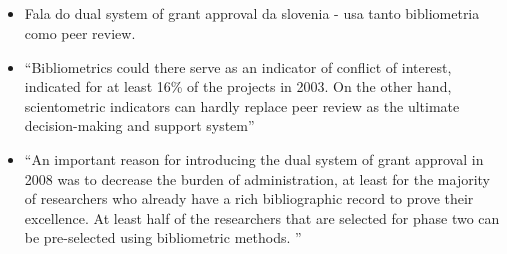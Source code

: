\documentclass[11pt]{article}
\begin{document}
\subsection{\cite{juznic2010}}
\label{sec:org89b9a2c}
\begin{itemize}
\item Fala do dual system of grant approval da slovenia - usa tanto bibliometria como peer review.
\item ``Bibliometrics could there serve as an indicator of conflict of interest, indicated for at least 16\% of the projects in 2003. On the other hand, scientometric indicators can hardly replace peer review as the ultimate decision-making and support system''
\item ``An important reason for introducing the dual system of grant approval in 2008 was to decrease the burden of administration, at least for the majority of researchers who already have a rich bibliographic record to prove their excellence. At least half of the researchers that are selected for phase two can be pre-selected using bibliometric methods. ''
\end{itemize}
\end{document}
